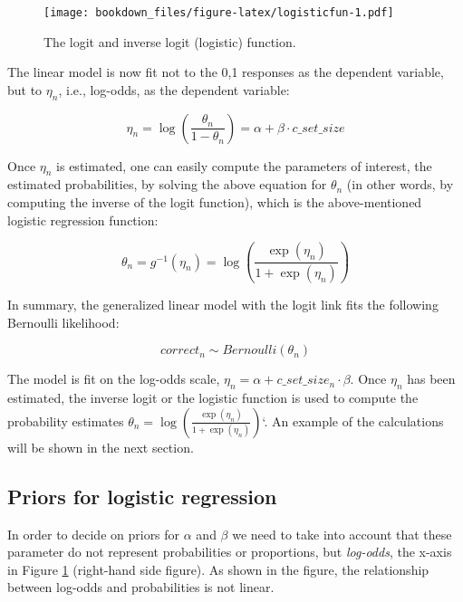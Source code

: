 \documentclass[12pt,]{krantz}
\theoremstyle{definition}
\theoremstyle{definition}
\theoremstyle{definition}
\theoremstyle{remark}
\begin{document}
\begin{figure}
\centering
\texttt{[image: bookdown\_files/figure-latex/logisticfun-1.pdf]}
\caption{\label{fig:logisticfun}The logit and inverse logit (logistic) function.}
\end{figure}

The linear model is now fit not to the 0,1 responses as the dependent variable, but to \(\eta_n\), i.e., log-odds, as the dependent variable:

\begin{equation}
\eta_n = \log\left(\frac{\theta_n}{1-\theta_n}\right) = \alpha + \beta \cdot c\_set\_size
\end{equation}

Once \(\eta_n\) is estimated, one can easily compute the parameters of interest, the estimated probabilities, by solving the above equation for \(\theta_n\) (in other words, by computing the inverse of the logit function), which is the above-mentioned logistic regression function:

\begin{equation}
\theta_n = g^{-1}(\eta_n) =  \log\left(\frac{\exp(\eta_n)}{1+\exp(\eta_n)}\right)
\end{equation}

In summary, the generalized linear model with the logit link fits the following Bernoulli likelihood:

\begin{equation}
correct_n \sim Bernoulli(\theta_n)
\label{eq:bernoullilogislik}
\end{equation}

The model is fit on the log-odds scale, \(\eta_n = \alpha + c\_set\_size_n \cdot \beta\).
Once \(\eta_n\) has been estimated, the inverse logit or the logistic function is used to compute the probability estimates
\(\theta_n = \log(\frac{\exp(\eta_n)}{1+\exp(\eta_n)})\)`. An example of the calculations will be shown in the next section.

\hypertarget{priors-for-logistic-regression}{%
\subsection{Priors for logistic regression}\label{priors-for-logistic-regression}}

In order to decide on priors for \(\alpha\) and \(\beta\) we need to take into account that these parameter do not represent probabilities or proportions, but \emph{log-odds}, the x-axis in Figure \ref{fig:logisticfun} (right-hand side figure). As shown in the figure, the relationship between log-odds and probabilities is not linear.
\end{document}
